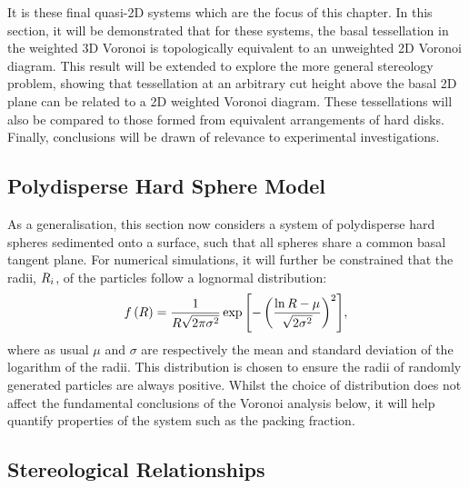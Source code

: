 It is these final quasi\--2D systems which are the focus of this chapter.
In this section, it will be demonstrated that for these systems, the basal tessellation in the weighted 3D Voronoi is topologically equivalent to an unweighted 2D Voronoi diagram.
This result will be extended to explore the more general stereology problem, showing that tessellation at an arbitrary cut height above the basal 2D plane can be related to a 2D weighted Voronoi diagram.
These tessellations will also be compared to those formed from equivalent arrangements of hard disks.
Finally, conclusions will be drawn of relevance to experimental investigations.

\subsection{Polydisperse Hard Sphere Model}

As a generalisation, this section now considers a system of polydisperse hard spheres sedimented onto a surface, such that all spheres share a common basal tangent plane.
For numerical simulations, it will further be constrained that the radii, $R_i$, of the particles follow a lognormal distribution:
\begin{equation}
	\label{eq:lognormal}
	f\left(R\right)=\frac{1}{R\sqrt{2\pi\sigma^2}}\exp{\left[-\left(\frac{\ln{R}-\mu}{\sqrt{2\sigma^2}}\right)^2\right]},
\end{equation}
where as usual $\mu$ and $\sigma$ are respectively the mean and standard deviation of the logarithm of the radii.
This distribution is chosen to ensure the radii of randomly generated particles are always positive.
Whilst the choice of distribution does not affect the fundamental conclusions of the Voronoi analysis below, it will help quantify properties of the system such as the packing fraction.

\subsection{Stereological Relationships}
\label{sec:vorrel}

